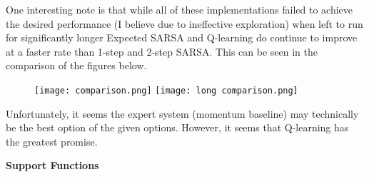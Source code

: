 \documentclass[12pt,letterpaper]{exam}
\begin{document}
\begin{questions}
\begin{solution}
    One interesting note is that while all of these implementations failed to achieve the 
    desired performance (I believe due to ineffective exploration) when left to run for 
    significantly longer Expected SARSA and Q-learning do continue to improve at a faster
    rate than 1-step and 2-step SARSA. This can be seen in the comparison of the figures below.

    \begin{figure}[H]
        \texttt{[image: comparison.png]}
        \texttt{[image: long comparison.png]}
    \end{figure}

    Unfortunately, it seems the expert system (momentum baseline) may technically be the best 
    option of the given options. However, it seems that Q-learning has the greatest promise.
\end{solution}
\end{questions}

\clearpage
\textbf{Support Functions} 
\inputminted{python3}{../HW4_functions.py}
\end{document}
